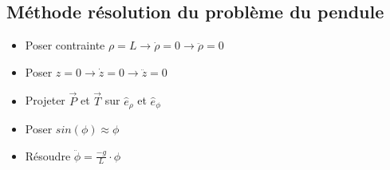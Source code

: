 \documentclass{article}
\begin{document}
\subsection{Méthode résolution du problème du pendule}

\begin{itemize}
    \item Poser contrainte $ \rho = L \rightarrow \dot{\rho} = 0 \rightarrow \ddot{\rho} = 0  $ 
    \item Poser $ z = 0 \rightarrow \dot{z} = 0 \rightarrow \ddot{z} = 0  $ 
    \item Projeter $ \overrightarrow{P} $ et $ \overrightarrow{T} $ sur $ \hat{e}_{\rho} $ et $ \hat{e}_{\phi} $ 
    \item Poser $ sin(\phi) \approx{\phi} $
    \item Résoudre $ \ddot{\phi} = \frac{-g}{L} \cdot \phi $
\end{itemize}
\end{document}
